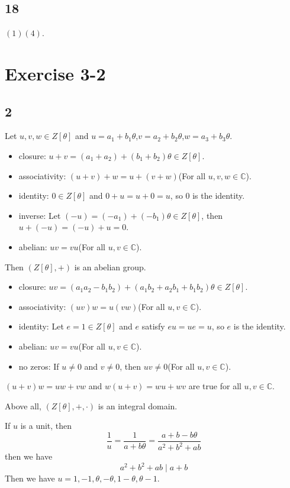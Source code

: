 \documentclass[draft]{article}
\begin{document}
		\subsection*{18}
			$(1)(4)$.
	\section*{Exercise 3-2}
		\subsection*{2}
			Let $u, v, w \in Z[\theta]$ and $u = a_1+b_1\theta$,$v = a_2+b_2\theta$,$w
			= a_3+b_3\theta$.
			\begin{itemize}
				\item closure:	
					$u + v = (a_1+a_2)+(b_1+b_2)\theta \in Z[\theta]$.
				\item associativity: 
					$(u+v)+w = u+(v+w)$(For all $u,v,w\in \mathbb{C}$).
				\item identity:
					$0 \in Z[\theta]$ and $0+u = u+0 = u$, so $0$ is the identity.
				\item inverse:
					Let $(-u) = (-a_1) + (-b_1)\theta \in Z[\theta]$, then $u+(-u) =
					(-u)+u = 0$.
				\item abelian:
					$uv=vu$(For all $u,v\in \mathbb{C}$).
			\end{itemize}
			Then $(Z[\theta],+)$ is an abelian group.
			\begin{itemize}
				\item closure:
					$uv = (a_1a_2-b_1b_2)+(a_1b_2+a_2b_1+b_1b_2)\theta \in Z[\theta]$.
				\item associativity:
					$(uv)w=u(vw)$(For all $u,v \in \mathbb{C}$).
				\item identity:
					Let $e = 1 \in Z[\theta]$ and $e$ satisfy $eu=ue=u$, so $e$ is the
					identity.
				\item abelian:
					$uv=vu$(For all $u,v \in \mathbb{C}$).
				\item no zeros:
					If $u \neq 0$ and $v \neq 0$, then $uv \neq 0$(For all $u,v\in
					\mathbb{C}$).
			\end{itemize}
			$(u+v)w = uw+vw$ and $w(u+v) = wu+wv$ are true for all $u,v \in
			\mathbb{C}$.
	
			Above all, $(Z[\theta],+,\cdot)$ is an integral domain.

			If $u$ is a unit, then
			$$
			\frac{1}{u} = \frac{1}{a+b\theta} = \frac{a+b-b\theta}{a^2+b^2+ab}
			$$
			then we have
			$$
			a^2 + b^2 + ab \mid a+b
			$$
			Then we have $u = 1, -1, \theta, -\theta, 1-\theta, \theta-1$.
\end{document}

